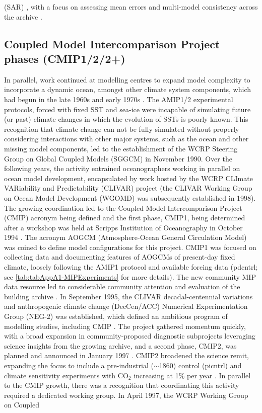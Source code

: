\documentclass[gmd, preprint]{copernicus}
\begin{document}
(SAR) \citep{gates_climate_1996}, with a focus on assessing mean errors and multi-model consistency across the archive \citep{gates_amip_1995}.


\subsection{Coupled Model Intercomparison Project phases (CMIP1/2/2+)}
\label{sec:cmip1And2And2Plus}
In parallel, work continued at modelling centres to expand model complexity to incorporate a dynamic ocean, amongst other climate system components, which had begun in the late 1960s and early 1970s \citep[e.g.,][]{manabe_climate_1969-1,manabe_global_1975,bryan_global_1975}. The AMIP1/2 experimental protocols, forced with fixed SST and sea-ice were incapable of simulating future (or past) climate changes in which the evolution of SSTs is poorly known. This recognition that climate change can not be fully simulated without properly considering interactions with other major systems, such as the ocean and other missing model components, led to the establishment of the WCRP Steering Group on Global Coupled Models (SGGCM) in November 1990. Over the following years, the activity entrained oceanographers working in parallel on ocean model development, encapsulated by work hosted by the WCRP CLImate VARiability and Predictability (CLIVAR) project (the CLIVAR Working Group on Ocean Model Development (WGOMD) was subsequently established in 1998). The growing coordination led to the Coupled Model Intercomparison Project (CMIP) acronym being defined and the first phase, CMIP1, being determined after a workshop was held at Scripps Institution of Oceanography in October 1994 \citep{meehl_global_1995}. The acronym AOGCM (Atmosphere-Ocean General Circulation Model) was coined to define model configurations for this project. CMIP1 was focused on collecting data and documenting features of AOGCMs of present-day fixed climate, loosely following the AMIP1 protocol and available forcing data (pdcntrl; see \autoref{tab:tabAppA1-MIPExperiments} for more details). The new community MIP data resource led to considerable community attention and evaluation of the building archive \citep{villwock_6th_2003, lambert_cmip1_2001, raisanen_co2-induced_2001}. In September 1995, the CLIVAR decadal-centennial variations and anthropogenic climate change (DecCen/ACC) Numerical Experimentation Group (NEG-2) was established, which defined an ambitious program of modelling studies, including CMIP \citep{villwock_what_1996, coughlan_report_1996}. The project gathered momentum quickly, with a broad expansion in community-proposed diagnostic subprojects leveraging science insights from the growing archive, and a second phase, CMIP2, was planned and announced in January 1997 \citep{meehl_intercomparison_1997, meehl_coupled_2000}. CMIP2 broadened the science remit, expanding the focus to include a pre-industrial ($\sim$1860) control (picntrl) and climate sensitivity experiments with CO$_{2}$ increasing at 1\% per year \citep[1pctto2x, 1pctto4x;][]{villwock_6th_2003, meehl_cmip_2003}. In parallel to the CMIP growth, there was a recognition that coordinating this activity required a dedicated working group. In April 1997, the WCRP Working Group on Coupled 
\end{document}
